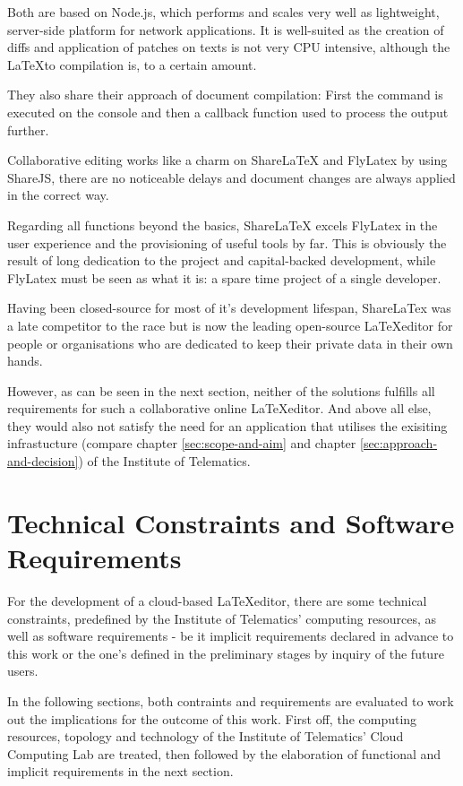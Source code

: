 Both are based on Node.js, which performs and scales very well as lightweight, server-side platform for network applications. It is well-suited as the creation of diffs and application of patches on texts is not very CPU intensive, although the \LaTeX to  compilation is, to a certain amount.

They also share their approach of document compilation: First the command is executed on the console and then a callback function used to process the output further.

Collaborative editing works like a charm on ShareLaTeX and FlyLatex by using ShareJS, there are no noticeable delays and document changes are always applied in the correct way.

Regarding all functions beyond the basics, ShareLaTeX excels FlyLatex in the user experience and the provisioning of useful tools by far. This is obviously the result of long dedication to the project and capital-backed development, while FlyLatex must be seen as what it is: a spare time project of a single developer.

Having been closed-source for most of it's development lifespan, ShareLaTex was a late competitor to the race but is now the leading open-source \LaTeX editor for people or organisations who are dedicated to keep their private data in their own hands. 

However, as can be seen in the next section, neither of the solutions fulfills all requirements for such a collaborative online \LaTeX editor. And above all else, they would also not satisfy the need for an application that utilises the exisiting infrastucture (compare chapter \ref{sec:scope-and-aim} and chapter \ref{sec:approach-and-decision}) of the Institute of Telematics. 

\section{Technical Constraints and Software Requirements}
For the development of a cloud-based \LaTeX editor, there are some technical constraints, predefined by the Institute of Telematics' computing resources, as well as software requirements - be it implicit requirements declared in advance to this work or the one's defined in the preliminary stages by inquiry of the future users.

In the following sections, both contraints and requirements are evaluated to work out the implications for the outcome of this work. First off, the computing resources, topology and technology of the Institute of Telematics' Cloud Computing Lab are treated, then followed by the elaboration of functional and implicit requirements in the next section.

